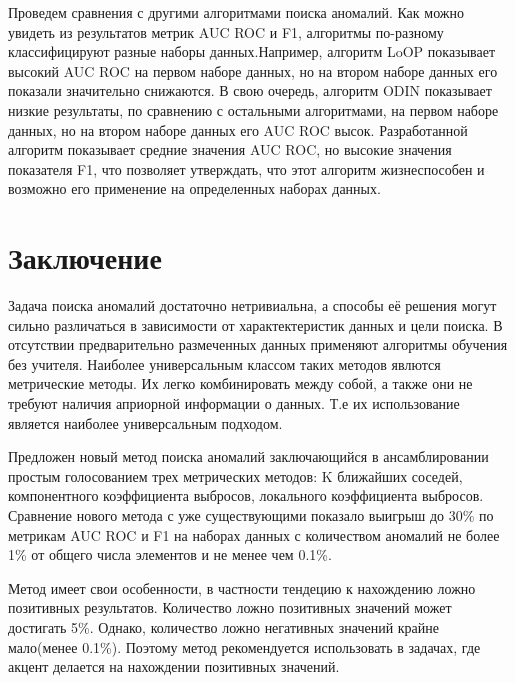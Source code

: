 Проведем сравнения с другими алгоритмами поиска аномалий.
Как можно увидеть из результатов  метрик AUC ROC и F1, алгоритмы по-разному классифицируют  разные наборы данных.Например, алгоритм LoOP показывает высокий AUC ROC на первом наборе данных, но на втором наборе данных его показали значительно снижаются. В свою очередь, алгоритм ODIN показывает низкие результаты, по сравнению с остальными алгоритмами, на первом наборе данных, но на втором наборе данных его AUC ROC высок. Разработанной алгоритм показывает средние значения AUC ROC, но высокие значения показателя F1, что позволяет утверждать, что этот алгоритм жизнеспособен и возможно его применение на определенных наборах данных. 




\section{Заключение}
Задача поиска аномалий достаточно нетривиальна, а способы её решения могут сильно различаться в зависимости от характектеристик данных и цели поиска. В отсутствии предварительно размеченных данных применяют алгоритмы обучения без учителя. Наиболее универсальным классом таких методов явлются метрические методы. Их легко комбинировать между собой, а также они не требуют наличия априорной информации о данных. Т.е их использование является наиболее универсальным подходом.

Предложен новый метод поиска аномалий заключающийся в ансамблировании простым голосованием трех метрических методов: K ближайших соседей, компонентного коэффициента выбросов, локального коэффициента выбросов. Сравнение нового метода с уже существующими  показало выигрыш до 30\% по метрикам AUC ROC и F1 на наборах данных с количеством аномалий не более 1\% от общего числа элементов и не менее чем 0.1\%.

Метод имеет свои особенности, в частности тендецию к нахождению ложно позитивных результатов. Количество ложно позитивных значений может достигать 5\%. Однако, количество ложно негативных значений крайне мало(менее 0.1\%). Поэтому метод рекомендуется использовать в задачах, где акцент делается на нахождении позитивных значений.



